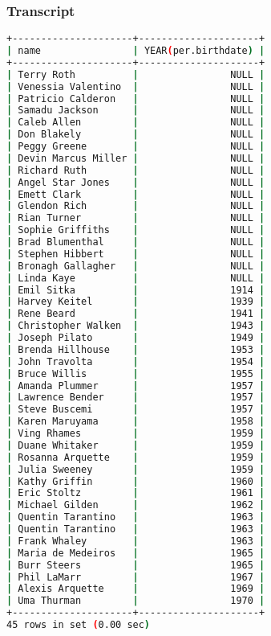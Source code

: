 \subsubsection{Transcript}
\begin{lstlisting}[language=bash]
+---------------------+---------------------+
| name                | YEAR(per.birthdate) |
+---------------------+---------------------+
| Terry Roth          |                NULL |
| Venessia Valentino  |                NULL |
| Patricio Calderon   |                NULL |
| Samadu Jackson      |                NULL |
| Caleb Allen         |                NULL |
| Don Blakely         |                NULL |
| Peggy Greene        |                NULL |
| Devin Marcus Miller |                NULL |
| Richard Ruth        |                NULL |
| Angel Star Jones    |                NULL |
| Emett Clark         |                NULL |
| Glendon Rich        |                NULL |
| Rian Turner         |                NULL |
| Sophie Griffiths    |                NULL |
| Brad Blumenthal     |                NULL |
| Stephen Hibbert     |                NULL |
| Bronagh Gallagher   |                NULL |
| Linda Kaye          |                NULL |
| Emil Sitka          |                1914 |
| Harvey Keitel       |                1939 |
| Rene Beard          |                1941 |
| Christopher Walken  |                1943 |
| Joseph Pilato       |                1949 |
| Brenda Hillhouse    |                1953 |
| John Travolta       |                1954 |
| Bruce Willis        |                1955 |
| Amanda Plummer      |                1957 |
| Lawrence Bender     |                1957 |
| Steve Buscemi       |                1957 |
| Karen Maruyama      |                1958 |
| Ving Rhames         |                1959 |
| Duane Whitaker      |                1959 |
| Rosanna Arquette    |                1959 |
| Julia Sweeney       |                1959 |
| Kathy Griffin       |                1960 |
| Eric Stoltz         |                1961 |
| Michael Gilden      |                1962 |
| Quentin Tarantino   |                1963 |
| Quentin Tarantino   |                1963 |
| Frank Whaley        |                1963 |
| Maria de Medeiros   |                1965 |
| Burr Steers         |                1965 |
| Phil LaMarr         |                1967 |
| Alexis Arquette     |                1969 |
| Uma Thurman         |                1970 |
+---------------------+---------------------+
45 rows in set (0.00 sec)
\end{lstlisting}

